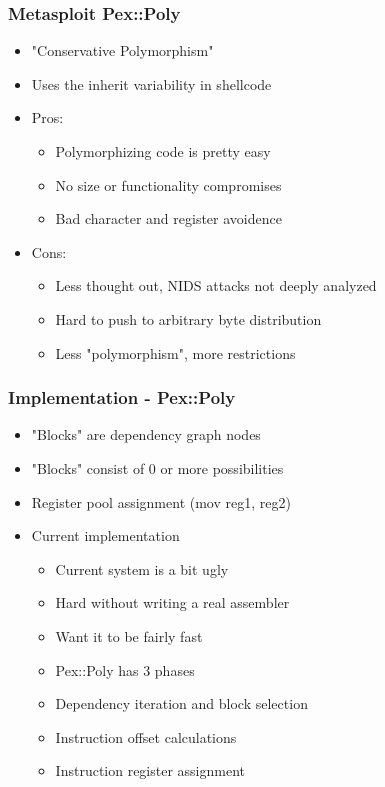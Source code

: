 \documentclass{beamer}
\newenvironment{sitemize}{\vspace{1mm}\begin{itemize}\itemsep 4pt\small}{\end{itemize}}
\begin{document}
\begin{frame}[t]
  \frametitle{Metasploit Pex::Poly}
  \begin{sitemize}
    \item "Conservative Polymorphism"
    \item Uses the inherit variability in shellcode
    \item Pros:
    \begin{sitemize}
      \item Polymorphizing code is pretty easy
      \item No size or functionality compromises
      \item Bad character and register avoidence
    \end{sitemize}
    \item Cons:
    \begin{sitemize}
      \item Less thought out, NIDS attacks not deeply analyzed
      \item Hard to push to arbitrary byte distribution
      \item Less "polymorphism", more restrictions
    \end{sitemize}
  \end{sitemize}
\end{frame}

\begin{frame}[t]
  \frametitle{Implementation - Pex::Poly}
  \begin{sitemize}
    \item "Blocks" are dependency graph nodes
    \item "Blocks" consist of 0 or more possibilities
    \item Register pool assignment (mov reg1, reg2)
    \item Current implementation
    \begin{sitemize}
      \item Current system is a bit ugly
      \item Hard without writing a real assembler
      \item Want it to be fairly fast
      \pause
      \item Pex::Poly has 3 phases
      \item Dependency iteration and block selection
      \item Instruction offset calculations
      \item Instruction register assignment
    \end{sitemize}
  \end{sitemize}
\end{frame}
\end{document}
